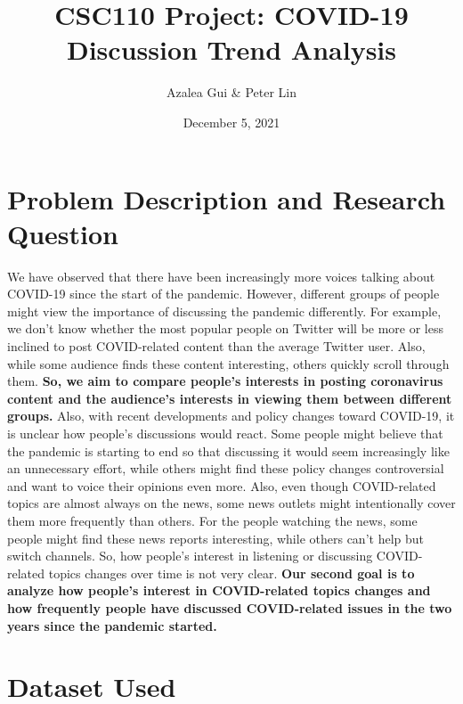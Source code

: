 \documentclass{article}
\title{CSC110 Project: COVID-19 Discussion Trend Analysis}
\author{Azalea Gui \& Peter Lin}
\date{December 5, 2021}
\begin{document}
    \maketitle

    \section{Problem Description and Research Question}
    \indent

    We have observed that there have been increasingly more voices talking about COVID-19 since the start of the pandemic. However, different groups of people might view the importance of discussing the pandemic differently. For example, we don't know whether the most popular people on Twitter will be more or less inclined to post COVID-related content than the average Twitter user. Also, while some audience finds these content interesting, others quickly scroll through them. \textbf{So, we aim to compare people's interests in posting coronavirus content and the audience's interests in viewing them between different groups.}  Also, with recent developments and policy changes toward COVID-19, it is unclear how people's discussions would react. Some people might believe that the pandemic is starting to end so that discussing it would seem increasingly like an unnecessary effort, while others might find these policy changes controversial and want to voice their opinions even more. Also, even though COVID-related topics are almost always on the news, some news outlets might intentionally cover them more frequently than others. For the people watching the news, some people might find these news reports interesting, while others can't help but switch channels. So, how people's interest in listening or discussing COVID-related topics changes over time is not very clear. \textbf{Our second goal is to analyze how people's interest in COVID-related topics changes and how frequently people have discussed COVID-related issues in the two years since the pandemic started.} 

    \section{Dataset Used}
    \indent
\end{document}
